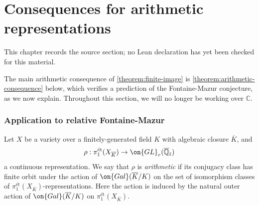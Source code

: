 \chapter{Consequences for arithmetic representations}
\label{canonical-representations-surface-groups-chapter-09}

\begin{remark}
\label{canonical-representations-surface-groups-chapter-09-source}
This chapter records the source section; no Lean declaration has yet been checked for this material.
\notready
\end{remark}

\label{section:arithmetic-applications}
The main arithmetic consequence of \autoref{theorem:finite-image} is \autoref{theorem:arithmetic-consequence} below, which verifies a prediction of the Fontaine-Mazur conjecture, as we now explain.
Throughout this section, we will no longer be working over $\mathbb C$.

\subsection{Application to relative Fontaine-Mazur}
\label{subsection:application-fontaine-mazur}
\begin{definition}
\notready
	\label{definition:arithmetic}
	Let $X$ be a variety over a finitely-generated field $K$ with algebraic closure $\overline{K}$, and
$$\rho: \pi_1^{\text{\'et}}(X_{\overline{K}})\to
\on{GL}_r(\overline{\mathbb{Q}}_\ell)$$ a
continuous representation. We
say that $\rho$ is \emph{arithmetic} if its conjugacy class has finite orbit
under the action of $\on{Gal}(\overline{K}/K)$ on the set of isomorphism classes of
$\pi_1^{\text{\'et}}(X_{\overline{K}})$-representations. Here the action is
induced by the natural outer action of $\on{Gal}(\overline{K}/K)$ on
$\pi_1^{\text{\'et}}(X_{\overline{K}})$.
\end{definition}

